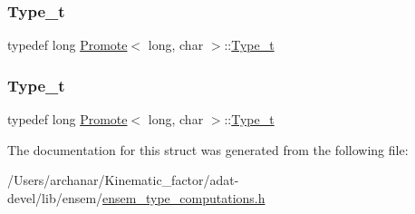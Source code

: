 \subsubsection{\texorpdfstring{Type\_t}{Type\_t}\hspace{0.1cm}{\footnotesize\ttfamily [2/3]}}
{\footnotesize\ttfamily typedef long \mbox{\hyperlink{structPromote}{Promote}}$<$ long, char $>$\+::\mbox{\hyperlink{structPromote_3_01long_00_01char_01_4_a04c143edd9915a489849f8e7da76543d}{Type\+\_\+t}}}

\mbox{\label{structPromote_3_01long_00_01char_01_4_a04c143edd9915a489849f8e7da76543d}} 
\subsubsection{\texorpdfstring{Type\_t}{Type\_t}\hspace{0.1cm}{\footnotesize\ttfamily [3/3]}}
{\footnotesize\ttfamily typedef long \mbox{\hyperlink{structPromote}{Promote}}$<$ long, char $>$\+::\mbox{\hyperlink{structPromote_3_01long_00_01char_01_4_a04c143edd9915a489849f8e7da76543d}{Type\+\_\+t}}}



The documentation for this struct was generated from the following file\+:\begin{DoxyCompactItemize}
\item 
/\+Users/archanar/\+Kinematic\+\_\+factor/adat-\/devel/lib/ensem/\mbox{\hyperlink{adat-devel_2lib_2ensem_2ensem__type__computations_8h}{ensem\+\_\+type\+\_\+computations.\+h}}\end{DoxyCompactItemize}
